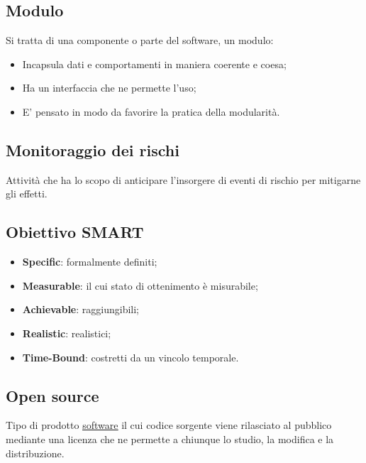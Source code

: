 	
	\subsection{Modulo}
	\label{sec:modulo}
	Si tratta di una componente o parte del software, un modulo:
	\begin{itemize}
	\item Incapsula dati e comportamenti in maniera coerente e coesa;
	\item Ha un interfaccia che ne permette l'uso;
	\item E' pensato in modo da favorire la pratica della modularità.
	\end{itemize}
	
	
	\subsection{Monitoraggio dei rischi}
	\label{sec:monitoraggiorischi}
	Attività che ha lo scopo di anticipare l'insorgere di eventi di rischio per mitigarne gli effetti.	
	

	\newpage

	\subsection{Obiettivo SMART}
	\label{sec:smart}
	\begin{itemize}
			\item \textbf{Specific}: formalmente definiti;
			\item \textbf{Measurable}: il cui stato di ottenimento è misurabile;
			\item \textbf{Achievable}: raggiungibili;
			\item \textbf{Realistic}: realistici;
			\item \textbf{Time-Bound}: costretti da un vincolo temporale.
		\end{itemize}


		
	\subsection{Open source}
	\label{sec:opensource}
	Tipo di prodotto \underline{\hyperref[sec:prodottosoftware]{software}} il cui codice sorgente viene rilasciato al pubblico mediante una licenza che ne permette a chiunque lo studio, la modifica e la distribuzione.
		

